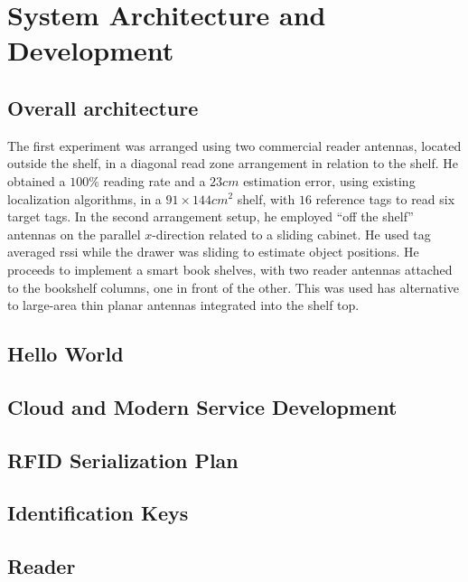 \chapter{System Architecture and Development}

\section{Overall architecture}

 
The first experiment was arranged using two commercial reader antennas, located outside the shelf, in a diagonal read zone arrangement in relation to the shelf. He obtained a $100\%$ reading rate and a $23cm$ estimation error, using existing localization algorithms, in a $91 \times 144cm^2$ shelf, with $16$ reference tags to read six target tags.
In the second arrangement setup, he employed ``off the shelf'' antennas on the parallel $x$-direction related to a sliding cabinet. He used tag averaged \ac{rssi} while the drawer was sliding to estimate object positions.
He proceeds to implement a smart book shelves, with two reader  antennas  attached  to  the  bookshelf  columns,  one  in  front  of  the  other. This was used has alternative to large-area thin planar antennas integrated into the shelf top.

\section{Hello World}

\section{Cloud and Modern Service Development}

\section{RFID Serialization Plan}

\section{Identification Keys}

\section{Reader}

